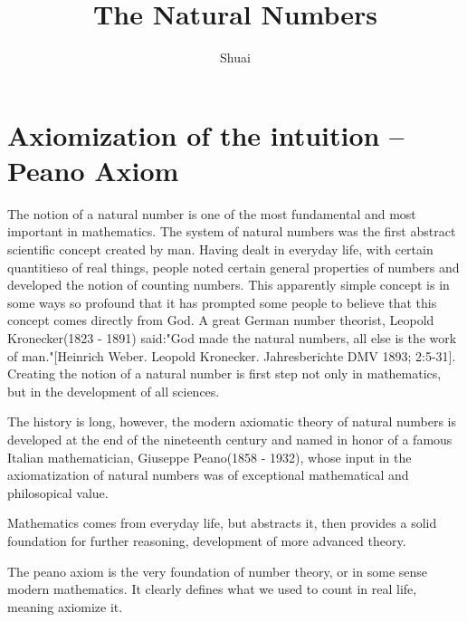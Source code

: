 \documentclass[a4paper]{article}
\title{The Natural Numbers}
\author{Shuai}
\begin{document}
\maketitle

\section{Axiomization of the intuition -- Peano Axiom}

	The notion of a natural number is one of the most fundamental and most
	important in mathematics. The system of natural numbers was the first
	abstract scientific concept created by man. Having dealt in everyday
	life, with certain quantitieso of real things, people noted certain
	general properties of numbers and developed the notion of counting
	numbers. This apparently simple concept is in some ways so profound that
	it has prompted some people to believe that this concept comes directly
	from God. A great German number theorist, Leopold Kronecker(1823 - 1891)
	said:"God made the natural numbers, all else is the work of
	man."[Heinrich Weber. Leopold Kronecker. Jahresberichte DMV 1893;
	2:5-31]. Creating the notion of a natural number is first step not only
	in mathematics, but in the development of all
	sciences\cite{dixon2011algebra}.

	The history is long, however, the modern axiomatic theory of natural
	numbers is developed at the end of the nineteenth century and named in
	honor of a famous Italian mathematician, Giuseppe Peano(1858 - 1932),
	whose input in the axiomatization of natural numbers was of exceptional
	mathematical and philosopical value\cite{dixon2011algebra}.

	Mathematics comes from everyday life, but abstracts it, then provides a
	solid foundation for further reasoning, development of more advanced
	theory.

	The peano axiom is the very foundation of number theory, or in some
	sense modern mathematics. It clearly defines what we used to count in
	real life, meaning axiomize it.
\end{document}
